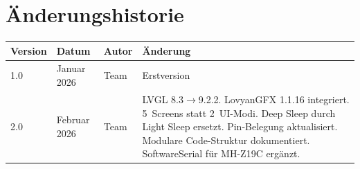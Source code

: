 \documentclass[a4paper,11pt]{article}
\begin{document}
\section*{Änderungshistorie}

\begin{longtable}{l l l p{7cm}}
\toprule
\rowcolor{tableheader}
\textbf{Version} & \textbf{Datum} & \textbf{Autor} & \textbf{Änderung} \\
\midrule
1.0 & Januar 2026 & Team & Erstversion \\
2.0 & Februar 2026 & Team & LVGL 8.3$\rightarrow$9.2.2. LovyanGFX 1.1.16 integriert. 5~Screens statt 2~UI-Modi. Deep Sleep durch Light Sleep ersetzt. Pin-Belegung aktualisiert. Modulare Code-Struktur dokumentiert. SoftwareSerial für MH-Z19C ergänzt. \\
\bottomrule
\end{longtable}
\end{document}
